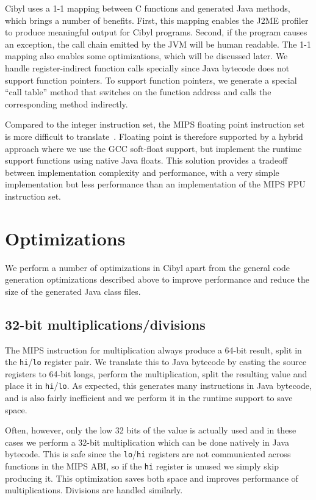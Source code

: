 Cibyl uses a 1-1 mapping between C functions and generated Java methods, which
brings a number of benefits. First, this mapping enables the J2ME profiler to
produce meaningful output for Cibyl programs. Second, if the program causes an
exception, the call chain emitted by the JVM will be human readable. The 1-1
mapping also enables some optimizations, which will be discussed later.  We
handle register-indirect function calls specially since Java bytecode does not
support function pointers. To support function pointers, we generate a special
``call table'' method that switches on the function address and calls the
corresponding method indirectly.

Compared to the integer instruction set, the MIPS floating point instruction
set is more difficult to translate~\cite{kagstrom07cibyl}. Floating point is
therefore supported by a hybrid approach where we use the GCC soft-float
support, but implement the runtime support functions using native Java floats.
This solution provides a tradeoff between implementation complexity and
performance, with a very simple implementation but less performance than an
implementation of the MIPS FPU instruction set.

\section{Optimizations}
\label{sec:cp:optimizations}
We perform a number of optimizations in Cibyl apart from the general code
generation optimizations described above to improve performance and reduce the
size of the generated Java class files.

\subsection{32-bit multiplications/divisions}
The MIPS instruction for multiplication always produce a 64-bit result, split
in the \texttt{hi}/\texttt{lo} register pair. We translate this to Java
bytecode by casting the source registers to 64-bit longs, perform the
multiplication, split the resulting value and place it in
\texttt{hi}/\texttt{lo}. As expected, this generates many instructions in Java
bytecode, and is also fairly inefficient and we perform it in the runtime
support to save space.

Often, however, only the low 32 bits of the value is actually used and in
these cases we perform a 32-bit multiplication which can be done natively in
Java bytecode. This is safe since the \texttt{lo}/\texttt{hi} registers are
not communicated across functions in the MIPS ABI, so if the \texttt{hi}
register is unused we simply skip producing it. This optimization saves both
space and improves performance of multiplications. Divisions are handled
similarly.

